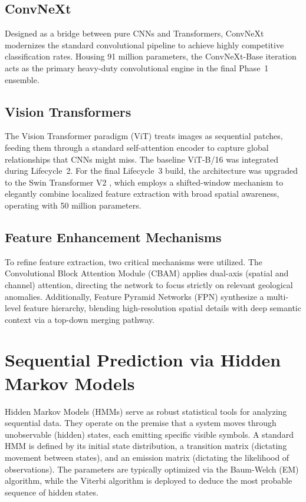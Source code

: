 \documentclass[12pt,a4paper]{report}
\begin{document}
\subsection{ConvNeXt}
Designed as a bridge between pure CNNs and Transformers, ConvNeXt \cite{liu2022convnext} modernizes the standard convolutional pipeline to achieve highly competitive classification rates. Housing 91 million parameters, the ConvNeXt-Base iteration acts as the primary heavy-duty convolutional engine in the final Phase~1 ensemble.

\subsection{Vision Transformers}
The Vision Transformer paradigm (ViT) \cite{dosovitskiy2020vit} treats images as sequential patches, feeding them through a standard self-attention encoder to capture global relationships that CNNs might miss. The baseline ViT-B/16 was integrated during Lifecycle~2. For the final Lifecycle~3 build, the architecture was upgraded to the Swin Transformer V2 \cite{liu2022swinv2}, which employs a shifted-window mechanism to elegantly combine localized feature extraction with broad spatial awareness, operating with 50 million parameters.

\subsection{Feature Enhancement Mechanisms}
To refine feature extraction, two critical mechanisms were utilized. The Convolutional Block Attention Module (CBAM) \cite{woo2018cbam} applies dual-axis (spatial and channel) attention, directing the network to focus strictly on relevant geological anomalies. Additionally, Feature Pyramid Networks (FPN) \cite{lin2017fpn} synthesize a multi-level feature hierarchy, blending high-resolution spatial details with deep semantic context via a top-down merging pathway.

\section{Sequential Prediction via Hidden Markov Models}
Hidden Markov Models (HMMs) \cite{rabiner1989hmm} serve as robust statistical tools for analyzing sequential data. They operate on the premise that a system moves through unobservable (hidden) states, each emitting specific visible symbols. A standard HMM is defined by its initial state distribution, a transition matrix (dictating movement between states), and an emission matrix (dictating the likelihood of observations). The parameters are typically optimized via the Baum-Welch (EM) algorithm, while the Viterbi algorithm is deployed to deduce the most probable sequence of hidden states.
\end{document}

